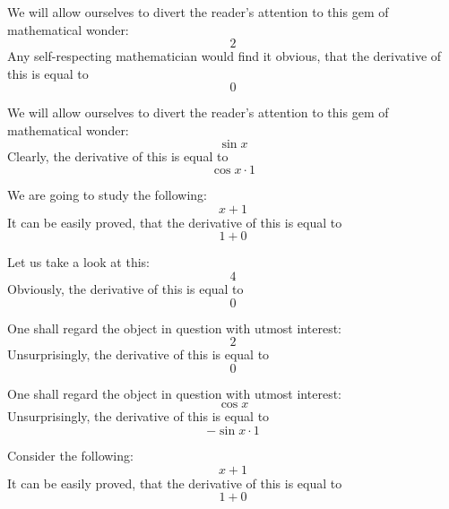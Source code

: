 \documentclass{article}
\begin{document}
We will allow ourselves to divert the reader's attention to this gem of mathematical wonder:
\begin{equation}
2 
\end{equation}
Any self-respecting mathematician would find it obvious, that the derivative of this is equal to
\begin{equation}
0 
\end{equation}

We will allow ourselves to divert the reader's attention to this gem of mathematical wonder:
\begin{equation}
\sin x 
\end{equation}
Clearly, the derivative of this is equal to
\begin{equation}
\cos x \cdot 1 
\end{equation}

We are going to study the following:
\begin{equation}
x + 1 
\end{equation}
It can be easily proved, that the derivative of this is equal to
\begin{equation}
1 + 0 
\end{equation}

Let us take a look at this:
\begin{equation}
4 
\end{equation}
Obviously, the derivative of this is equal to
\begin{equation}
0 
\end{equation}

One shall regard the object in question with utmost interest:
\begin{equation}
2 
\end{equation}
Unsurprisingly, the derivative of this is equal to
\begin{equation}
0 
\end{equation}

One shall regard the object in question with utmost interest:
\begin{equation}
\cos x 
\end{equation}
Unsurprisingly, the derivative of this is equal to
\begin{equation}
-\sin x \cdot 1 
\end{equation}

Consider the following:
\begin{equation}
x + 1 
\end{equation}
It can be easily proved, that the derivative of this is equal to
\begin{equation}
1 + 0 
\end{equation}
\end{document}
